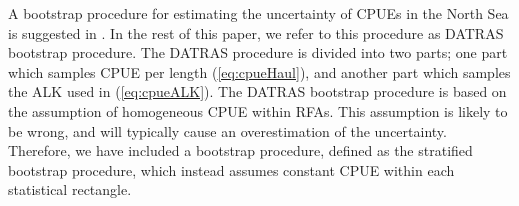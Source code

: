 \documentclass[a4paper 12pt]{article}
\numberwithin{equation}{section}
\begin{document}

A bootstrap procedure for estimating the uncertainty of CPUEs in the North Sea is suggested in  \citet{ICES2013}. In the rest of this paper, we refer to this procedure as DATRAS bootstrap procedure. The DATRAS procedure is divided into two parts; one part which samples CPUE per length (\ref{eq:cpueHaul}), and another part which samples the ALK used in (\ref{eq:cpueALK}). The DATRAS bootstrap procedure is based on the assumption of homogeneous CPUE within RFAs. This assumption is likely to be wrong, and will typically cause an overestimation of the uncertainty.  Therefore, we have included a bootstrap procedure, defined as the stratified bootstrap procedure, which instead assumes constant CPUE within each statistical rectangle. 
\end{document}
